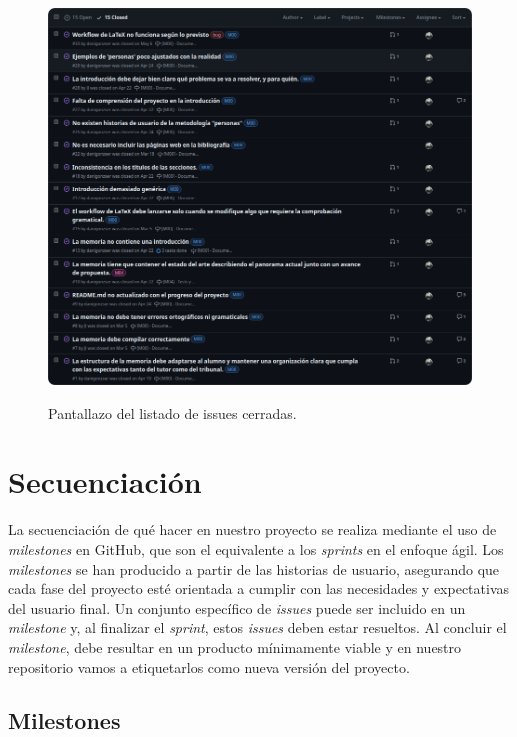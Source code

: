 \begin{figure}[H]
    \caption{Pantallazo del listado de issues cerradas.}
    \centering
    \vspace*{0.5cm}
    \includegraphics[scale=0.2]{figuras/listado_issues_cerradas.png}\label{fig:figuras/listado_issues_cerradas.png}
\end{figure}

\section{Secuenciación}

La secuenciación de qué hacer en nuestro proyecto se realiza mediante el uso de \textit{milestones} en GitHub, que son el equivalente a los \textit{sprints} en el enfoque ágil. Los \textit{milestones} se han producido a partir de las historias de usuario, asegurando que cada fase del proyecto esté orientada a cumplir con las necesidades y expectativas del usuario final. Un conjunto específico de \textit{issues} puede ser incluido en un \textit{milestone} y, al finalizar el \textit{sprint}, estos \textit{issues} deben estar resueltos. Al concluir el \textit{milestone}, debe resultar en un producto mínimamente viable y en nuestro repositorio vamos a etiquetarlos como nueva versión del proyecto.

\subsection{Milestones}

